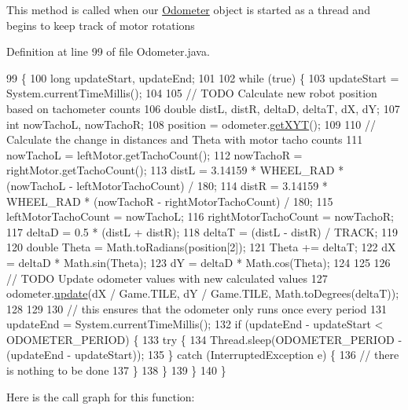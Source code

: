 This method is called when our \hyperlink{classca_1_1mcgill_1_1ecse211_1_1odometer_1_1_odometer}{Odometer} object is started as a thread and begins to keep track of motor rotations 

Definition at line 99 of file Odometer.\+java.


\begin{DoxyCode}
99                     \{
100     \textcolor{keywordtype}{long} updateStart, updateEnd;
101 
102     \textcolor{keywordflow}{while} (\textcolor{keyword}{true}) \{
103       updateStart = System.currentTimeMillis();
104 
105       \textcolor{comment}{// TODO Calculate new robot position based on tachometer counts}
106       \textcolor{keywordtype}{double} distL, distR, deltaD, deltaT, dX, dY;
107       \textcolor{keywordtype}{int} nowTachoL, nowTachoR;
108       position = odometer.\hyperlink{classca_1_1mcgill_1_1ecse211_1_1odometer_1_1_odometer_data_a8f40f0264c68f0cbed4fff1723ae7863}{getXYT}();
109 
110       \textcolor{comment}{// Calculate the change in distances and Theta with motor tacho counts}
111       nowTachoL = leftMotor.getTachoCount();
112       nowTachoR = rightMotor.getTachoCount();
113       distL = 3.14159 * WHEEL\_RAD * (nowTachoL - leftMotorTachoCount) / 180;
114       distR = 3.14159 * WHEEL\_RAD * (nowTachoR - rightMotorTachoCount) / 180;
115       leftMotorTachoCount = nowTachoL;
116       rightMotorTachoCount = nowTachoR;
117       deltaD = 0.5 * (distL + distR);
118       deltaT = (distL - distR) / TRACK;
119 
120       \textcolor{keywordtype}{double} Theta = Math.toRadians(position[2]);
121       Theta += deltaT;
122       dX = deltaD * Math.sin(Theta);
123       dY = deltaD * Math.cos(Theta);
124 
125 
126       \textcolor{comment}{// TODO Update odometer values with new calculated values}
127       odometer.\hyperlink{classca_1_1mcgill_1_1ecse211_1_1odometer_1_1_odometer_data_aaa06f190d634299fcb1b97a1891dad85}{update}(dX / Game.TILE, dY / Game.TILE, Math.toDegrees(deltaT));
128 
129 
130       \textcolor{comment}{// this ensures that the odometer only runs once every period}
131       updateEnd = System.currentTimeMillis();
132       \textcolor{keywordflow}{if} (updateEnd - updateStart < ODOMETER\_PERIOD) \{
133         \textcolor{keywordflow}{try} \{
134           Thread.sleep(ODOMETER\_PERIOD - (updateEnd - updateStart));
135         \} \textcolor{keywordflow}{catch} (InterruptedException e) \{
136           \textcolor{comment}{// there is nothing to be done}
137         \}
138       \}
139     \}
140   \}
\end{DoxyCode}
Here is the call graph for this function\+:
